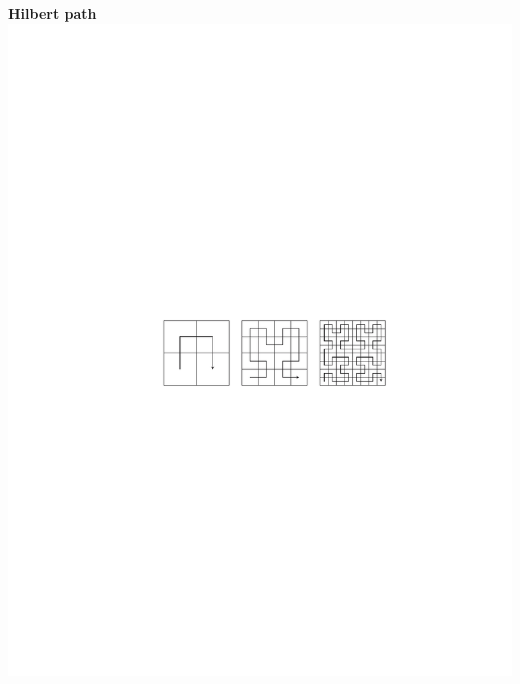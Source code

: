 \begin{frame}
\begin{columns}
\begin{column}{0.6\textwidth}
        \vspace{2mm}

	\textbf{Hilbert path}
	\includegraphics[scale=0.5, viewport = 150 350 500 435, clip]{figures/hilbert.pdf}
    \end{column}
    \end{columns}
\end{frame}

